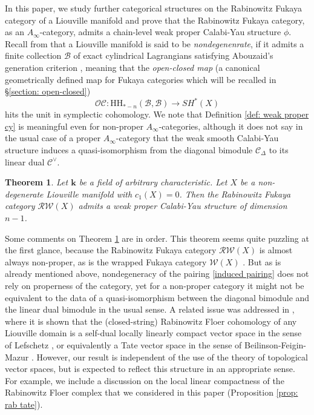 \documentclass[11pt]{amsproc}
\def\K{{\mathbf{k}}}
\def\w{\mathcal{W}(E)}
\def\B{\mathcal{B}}
\def\cc{\mathcal{C}}
\def\oc{\mathcal{OC}}
\def\r#1{\mathrm{#1}}
\def\w{\mathcal{W}}
\def\rw{\mathcal{RW}}
\def\D{\Delta}
\def\ainf{A_\infty}
\newtheorem{thm}[lem]{Theorem}
\theoremstyle{remark}
\numberwithin{equation}{section}
\begin{document}
In this paper, we study further categorical structures on the Rabinowitz Fukaya category of a Liouville manifold and prove that the Rabinowitz Fukaya category, as an $\ainf$-category, admits a chain-level weak proper Calabi-Yau structure $\phi$.
Recall from \cite{ganatra} that a Liouville manifold is said to be {\it nondegenenrate}, 
if it admits a finite collection $\B$ of exact cylindrical Lagrangians satisfying Abouzaid's generation criterion \cite{abouzaid_gc},
meaning that the {\it open-closed map} (a canonical geometrically defined map for Fukaya categories which will be recalled in \S\ref{section: open-closed})
\begin{equation}
\oc: \r{HH}_{*-n}(\B, \B) \to SH^{*}(X)
\end{equation}
hits the unit in symplectic cohomology.
We note that Definition \ref{def: weak proper cy} is meaningful even for non-proper $\ainf$-categories,
although it does not say in the usual case of a proper $\ainf$-category that the weak smooth Calabi-Yau structure induces a quasi-isomorphism from the diagonal bimodule $\cc_{\D}$ to its linear dual $\cc^{\vee}$.


\begin{thm}\label{thm: rw cy}
Let $\K$ be a field of arbitrary characteristic. 
Let $X$ be a non-degenerate Liouville manifold with $c_{1}(X) = 0$.
Then the Rabinowitz Fukaya category $\rw(X)$ admits a weak proper Calabi-Yau structure of dimension $n-1$.
\end{thm}

Some comments on Theorem \ref{thm: rw cy} are in order.
This theorem seems quite puzzling at the first glance,
because the Rabinowitz Fukaya category $\rw(X)$ is almost always non-proper,
as is the wrapped Fukaya category $\w(X)$ \cite{Gnonproper, GGV}.
But as is already mentioned above, 
nondegeneracy of the pairing \eqref{induced pairing} does not rely on properness of the category,
yet for a non-proper category it might not be equivalent to the data of a quasi-isomorphism between the diagonal bimodule and the linear dual bimodule in the usual sense.
A related issue was addressed in \cite{CO_tate}, 
where it is shown that the (closed-string) Rabinowitz Floer cohomology of any Liouville domain is a self-dual locally linearly compact vector space in the sense of Lefschetz \cite{lefschetz}, or equivalently a Tate vector space in the sense of Beilinson-Feigin-Mazur \cite{Beilinson-Feigin-Mazur}.
However, our result is independent of the use of the theory of topological vector spaces,
but is expected to reflect this structure in an appropriate sense.
For example, we include a discussion on the local linear compactness of the Rabinowitz Floer complex that we considered in this paper (Proposition \ref{prop: rab tate}).
\end{document}
